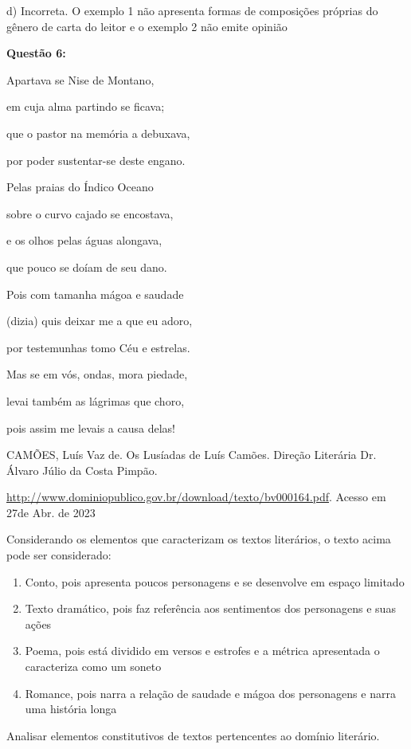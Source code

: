 d) Incorreta. O exemplo 1 não apresenta formas de composições próprias
do gênero de carta do leitor e o exemplo 2 não emite opinião

\textbf{Questão 6:}

Apartava se Nise de Montano,

em cuja alma partindo se ficava;

que o pastor na memória a debuxava,

por poder sustentar-se deste engano.

Pelas praias do Índico Oceano

sobre o curvo cajado se encostava,

e os olhos pelas águas alongava,

que pouco se doíam de seu dano.

Pois com tamanha mágoa e saudade

(dizia) quis deixar me a que eu adoro,

por testemunhas tomo Céu e estrelas.

Mas se em vós, ondas, mora piedade,

levai também as lágrimas que choro,

pois assim me levais a causa delas!

CAMÕES, Luís Vaz de. Os Lusíadas de Luís Camões. Direção Literária Dr.
Álvaro Júlio da Costa Pimpão.

\href{http://www.dominiopublico.gov.br/download/texto/bv000164.pdf}{{http://www.dominiopublico.gov.br/download/texto/bv000164.pdf}}.
Acesso em 27de Abr. de 2023

Considerando os elementos que caracterizam os textos literários, o texto
acima pode ser considerado:

\begin{enumerate}
\def\labelenumi{\alph{enumi})}
\item
  Conto, pois apresenta poucos personagens e se desenvolve em espaço
  limitado
\item
  Texto dramático, pois faz referência aos sentimentos dos personagens e
  suas ações
\item
  Poema, pois está dividido em versos e estrofes e a métrica apresentada
  o caracteriza como um soneto
\item
  Romance, pois narra a relação de saudade e mágoa dos personagens e
  narra uma história longa
\end{enumerate}

Analisar elementos constitutivos de textos pertencentes ao domínio
literário.


